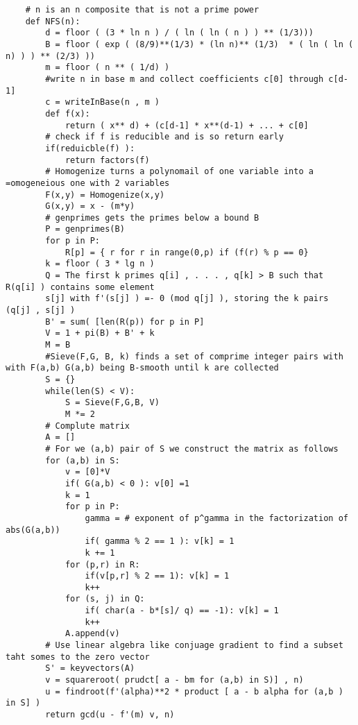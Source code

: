 \documentclass{article}
\begin{document}
\begin{verbatim}
    # n is an n composite that is not a prime power
    def NFS(n):
        d = floor ( (3 * ln n ) / ( ln ( ln ( n ) ) ** (1/3)))
        B = floor ( exp ( (8/9)**(1/3) * (ln n)** (1/3)  * ( ln ( ln ( n) ) ) ** (2/3) ))
        m = floor ( n ** ( 1/d) )
        #write n in base m and collect coefficients c[0] through c[d-1]
        c = writeInBase(n , m )
        def f(x):
            return ( x** d) + (c[d-1] * x**(d-1) + ... + c[0]
        # check if f is reducible and is so return early
        if(reduicble(f) ):
            return factors(f)
        # Homogenize turns a polynomail of one variable into a =omogeneious one with 2 variables
        F(x,y) = Homogenize(x,y)
        G(x,y) = x - (m*y)
        # genprimes gets the primes below a bound B
        P = genprimes(B)
        for p in P:
            R[p] = { r for r in range(0,p) if (f(r) % p == 0}
        k = floor ( 3 * lg n )
        Q = The first k primes q[i] , . . . , q[k] > B such that R(q[i] ) contains some element
        s[j] with f'(s[j] ) =- 0 (mod q[j] ), storing the k pairs (q[j] , s[j] )
        B' = sum( [len(R(p)) for p in P]
        V = 1 + pi(B) + B' + k
        M = B
        #Sieve(F,G, B, k) finds a set of comprime integer pairs with with F(a,b) G(a,b) being B-smooth until k are collected
        S = {}
        while(len(S) < V):
            S = Sieve(F,G,B, V)
            M *= 2
        # Complute matrix
        A = []
        # For we (a,b) pair of S we construct the matrix as follows
        for (a,b) in S:
            v = [0]*V
            if( G(a,b) < 0 ): v[0] =1
            k = 1
            for p in P:
                gamma = # exponent of p^gamma in the factorization of abs(G(a,b))
                if( gamma % 2 == 1 ): v[k] = 1
                k += 1
            for (p,r) in R:
                if(v[p,r] % 2 == 1): v[k] = 1
                k++
            for (s, j) in Q:
                if( char(a - b*[s]/ q) == -1): v[k] = 1
                k++
            A.append(v)
        # Use linear algebra like conjuage gradient to find a subset taht somes to the zero vector
        S' = keyvectors(A)
        v = squareroot( prudct[ a - bm for (a,b) in S)] , n)
        u = findroot(f'(alpha)**2 * product [ a - b alpha for (a,b ) in S] )
        return gcd(u - f'(m) v, n)
\end{verbatim}
\end{document}
